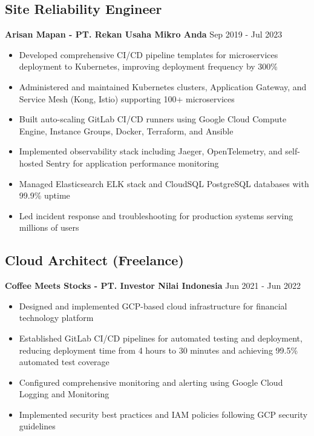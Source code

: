 \documentclass[11pt,a4paper]{article}
\newcommand{\company}[1]{\textbf{\color{primary}#1}}
\newcommand{\daterange}[1]{\color{secondary}#1}  %
\begin{document}
\subsection{Site Reliability Engineer}
\company{Arisan Mapan - PT. Rekan Usaha Mikro Anda} \hfill \daterange{Sep 2019 - Jul 2023}
\begin{itemize}[leftmargin=*, itemsep=2pt]
    \item Developed comprehensive CI/CD pipeline templates for microservices deployment to Kubernetes, improving deployment frequency by 300\%
    \item Administered and maintained Kubernetes clusters, Application Gateway, and Service Mesh (Kong, Istio) supporting 100+ microservices
    \item Built auto-scaling GitLab CI/CD runners using Google Cloud Compute Engine, Instance Groups, Docker, Terraform, and Ansible
    \item Implemented observability stack including Jaeger, OpenTelemetry, and self-hosted Sentry for application performance monitoring
    \item Managed Elasticsearch ELK stack and CloudSQL PostgreSQL databases with 99.9\% uptime
    \item Led incident response and troubleshooting for production systems serving millions of users
\end{itemize}

\subsection{Cloud Architect (Freelance)}
\company{Coffee Meets Stocks - PT. Investor Nilai Indonesia} \hfill \daterange{Jun 2021 - Jun 2022}
\begin{itemize}[leftmargin=*, itemsep=2pt]
    \item Designed and implemented GCP-based cloud infrastructure for financial technology platform
            \item Established GitLab CI/CD pipelines for automated testing and deployment, reducing deployment time from 4 hours to 30 minutes and achieving 99.5\% automated test coverage
    \item Configured comprehensive monitoring and alerting using Google Cloud Logging and Monitoring
    \item Implemented security best practices and IAM policies following GCP security guidelines
\end{itemize}
\end{document}
